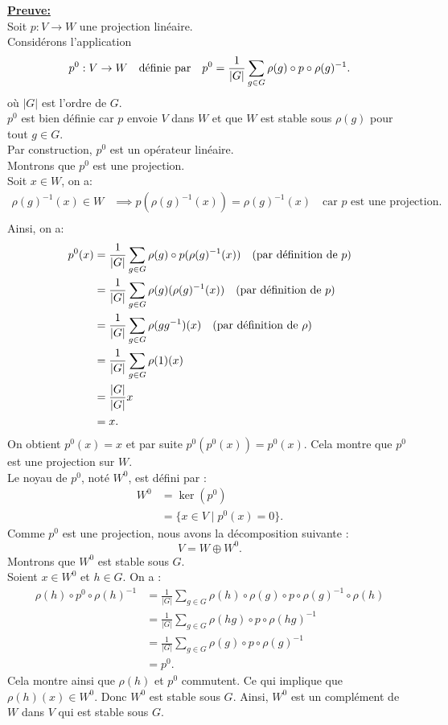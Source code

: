 \documentclass[a4paper, 14pt]{report}
\begin{document}
\begin{onehalfspace}
{			\textbf{\underline{Preuve:}}\\
			Soit \(  p : V \to W \) une projection linéaire.\\
			Considérons l'application
			\[
			p^0 : V \to W \quad \text{définie par} \quad  \text{\(	p^0 = \frac{1}{|G|} \sum_{g \in G} \rho(g) \circ p \circ \rho(g)^{-1}.\)} 
			\]
			où $|G|$ est l'ordre de $G$.\\
			$p^0$ est bien définie car $p$ envoie $V$ dans $W$ et que $W$ est stable sous $\rho(g)$ pour tout $g \in G$. \\
			Par construction, $p^0$ est un opérateur linéaire.\\
			Montrons que $p^0$ est une projection. \\
			Soit $x \in W$, on a:
			\[
			\begin{aligned}
				\rho(g)^{-1} (x) \in W & \implies p(\rho(g)^{-1} (x)) = \rho(g)^{-1} (x)  \quad \text{car $p$ est une projection}.\\
			\end{aligned}
			\]
			Ainsi, on a:
			\[
			\begin{aligned}
				p^0(x) &= \frac{1}{|G|} \sum_{g \in G} \rho(g) \circ p(\rho(g)^{-1}(x)) \quad \text{(par définition de \( p \))} \\
				&= \frac{1}{|G|} \sum_{g \in G} \rho(g)(\rho(g)^{-1}(x)) \quad \text{(par définition de \( p \))} \\
				&= \frac{1}{|G|} \sum_{g \in G} \rho(gg^{-1})(x) \quad \text{(par définition de \( \rho \))} \\
				&= \frac{1}{|G|} \sum_{g \in G} \rho(1)(x) \\
				&= \frac{|G|}{|G|} x \\
				&= x.
			\end{aligned}
			\]
			On obtient $p^0(x) = x$ et par suite $p^{0}(p^0(x)) = p^{0}(x)$.
			Cela montre que $p^0$ est une projection sur $W$.\\
			Le noyau de $p^0$, noté $W^0$, est défini par :
			\[
			\begin{aligned}
				W^0 &= \ker(p^0) \\
				&= \{x \in V \mid p^0(x) = 0\}.
			\end{aligned}
			\]
			Comme $p^0$ est une projection, nous avons la décomposition suivante :
			\[
			V = W \oplus W^0.
			\]
			Montrons que $W^0$ est stable sous $G$.\\
			Soient $x \in W^0$ et $h \in G$. On a :
			\[
			\begin{aligned}
				\rho(h) \circ p^0 \circ \rho(h)^{-1} &= \frac{1}{|G|} \sum_{g \in G} \rho(h) \circ \rho(g) \circ p \circ \rho(g)^{-1} \circ \rho(h) \\
				&= \frac{1}{|G|} \sum_{g \in G} \rho(hg) \circ p \circ \rho(hg)^{-1} \\
				&= \frac{1}{|G|} \sum_{g \in G} \rho(g) \circ p \circ \rho(g)^{-1} \\
				&= p^0.
			\end{aligned}
			\]
			Cela montre ainsi que \( \rho(h) \) et \( p^0 \) commutent.
			Ce qui implique que $\rho(h)(x) \in W^0$. Donc $W^0$ est stable sous $G$.
			Ainsi, $W^0$ est un complément de $W$ dans $V$ qui est stable sous $G$.
			
}
\end{onehalfspace}
\end{document}
